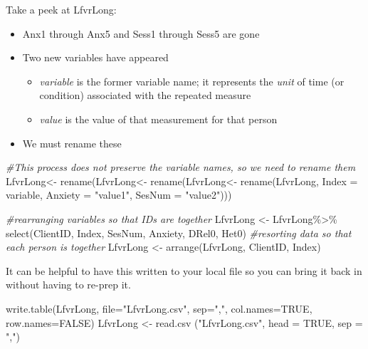 \documentclass[
  11pt,
]{book}
\newenvironment{Shaded}{\begin{snugshade}}{\end{snugshade}}
\newcommand{\AttributeTok}[1]{\textcolor[rgb]{0.77,0.63,0.00}{#1}}
\newcommand{\CommentTok}[1]{\textcolor[rgb]{0.56,0.35,0.01}{\textit{#1}}}
\newcommand{\ConstantTok}[1]{\textcolor[rgb]{0.00,0.00,0.00}{#1}}
\newcommand{\FunctionTok}[1]{\textcolor[rgb]{0.00,0.00,0.00}{#1}}
\newcommand{\NormalTok}[1]{#1}
\newcommand{\OtherTok}[1]{\textcolor[rgb]{0.56,0.35,0.01}{#1}}
\newcommand{\SpecialCharTok}[1]{\textcolor[rgb]{0.00,0.00,0.00}{#1}}
\newcommand{\StringTok}[1]{\textcolor[rgb]{0.31,0.60,0.02}{#1}}
\providecommand{\tightlist}{%
  \setlength{\itemsep}{0pt}\setlength{\parskip}{0pt}}
\begin{document}
Take a peek at LfvrLong:

\begin{itemize}
\tightlist
\item
  Anx1 through Anx5 and Sess1 through Sess5 are gone
\item
  Two new variables have appeared

  \begin{itemize}
  \tightlist
  \item
    \emph{variable} is the former variable name; it represents the \emph{unit} of time (or condition) associated with the repeated measure
  \item
    \emph{value} is the value of that measurement for that person
  \end{itemize}
\item
  We must rename these
\end{itemize}

\begin{Shaded}
\begin{Highlighting}[]
\CommentTok{\#This process  does not preserve the variable names, so we need to rename them}
\NormalTok{LfvrLong}\OtherTok{\textless{}{-}}  \FunctionTok{rename}\NormalTok{(LfvrLong}\OtherTok{\textless{}{-}}  \FunctionTok{rename}\NormalTok{(LfvrLong}\OtherTok{\textless{}{-}}  \FunctionTok{rename}\NormalTok{(LfvrLong, }\AttributeTok{Index =}\NormalTok{ variable, }\AttributeTok{Anxiety =} \StringTok{"value1"}\NormalTok{, }\AttributeTok{SesNum =} \StringTok{"value2"}\NormalTok{)))}

\CommentTok{\#rearranging variables so that IDs are together}
\NormalTok{LfvrLong }\OtherTok{\textless{}{-}}\NormalTok{ LfvrLong}\SpecialCharTok{\%\textgreater{}\%}
  \FunctionTok{select}\NormalTok{(ClientID, Index, SesNum, Anxiety, DRel0, Het0)}
\CommentTok{\#resorting data so that each person is together}
\NormalTok{LfvrLong }\OtherTok{\textless{}{-}} \FunctionTok{arrange}\NormalTok{(LfvrLong, ClientID, Index)}
\end{Highlighting}
\end{Shaded}

It can be helpful to have this written to your local file so you can bring it back in without having to re-prep it.

\begin{Shaded}
\begin{Highlighting}[]
\FunctionTok{write.table}\NormalTok{(LfvrLong, }\AttributeTok{file=}\StringTok{"LfvrLong.csv"}\NormalTok{, }\AttributeTok{sep=}\StringTok{","}\NormalTok{, }\AttributeTok{col.names=}\ConstantTok{TRUE}\NormalTok{, }\AttributeTok{row.names=}\ConstantTok{FALSE}\NormalTok{)}
\NormalTok{LfvrLong }\OtherTok{\textless{}{-}} \FunctionTok{read.csv}\NormalTok{ (}\StringTok{"LfvrLong.csv"}\NormalTok{, }\AttributeTok{head =} \ConstantTok{TRUE}\NormalTok{, }\AttributeTok{sep =} \StringTok{","}\NormalTok{)}
\end{Highlighting}
\end{Shaded}
\end{document}
